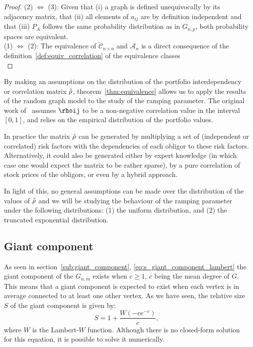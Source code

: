 \begin{proof}

(2) $\Leftrightarrow$ (3):
Given that (i) a graph is defined unequivocally by its adjacency matrix, that (ii) all elements of $a_{ij}$ are by definition independent and that (iii) $P_A$ follows the same probability distribution as in $G_{n,p}$, both probability spaces are equivalent.
\\
(1) $\Leftrightarrow$ (2):
The equivalence of $\widetilde{\mathcal{C}}_{n\times n}$ and $\mathcal{A}_n$ is a direct consequence of the definition~\ref{def:equiv_correlation} of the equivalence classes \\
\end{proof}


\vspace{0.5cm}

By making an assumptions on the distribution of the portfolio interdependency or correlation matrix $\hat{\rho}$, theorem~\vref{thm:equivalence} allows us to apply the results of the random graph model to the study of the ramping parameter.
The original work of~\cite{Sindel:2009vd} assumes $\rhoij$ to be a non-negative correlation value in the interval $[0,1]$, and relies on the empirical distribution of the portfolio values.

In practice the matrix $\hat{\rho}$ can be generated by multiplying a set of (independent or correlated) risk factors with the dependencies of each obligor to these risk factors.
Alternatively, it could also be generated either by expert knowledge (in which case one would expect the matrix to be rather sparse), by a pure correlation of stock prices of the obligors, or even by a hybrid approach.

In light of this, no general assumptions can be made over the distribution of the values of $\hat{\rho}$ and we will be studying the behaviour of the ramping parameter under the following distributions:
(1) the uniform distribution, and (2) the truncated exponential distribution.


\subsection{Giant component} %
\label{sub:giant_component}

As seen in section~\vref{sub:giant_component}, \vref{eq:s_giant_component_lambert} the giant component of the $G_{n,m}$ exists when $c \ge 1$, $c$ being the mean degree of $G$.
This means that a giant component is expected to exist when each vertex is in average connected to at least one other vertex.
As we have seen, the relative size $S$ of the giant component is given by:
\begin{equation}
	S = 1 + \frac{W(-c e^{-c})}{c},
\end{equation}
\noindent where $W$ is the Lambert-$W$ function.
Although there is no closed-form solution for this equation, it is possible to solve it numerically.

